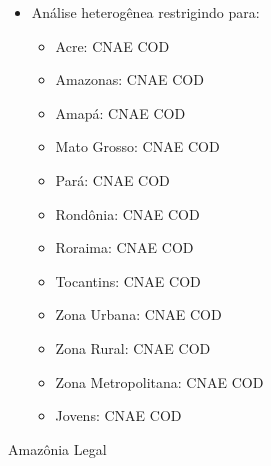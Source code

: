 \documentclass[8pt]{beamer}
\begin{document}
\begin{frame}[label=indice_principal]{}
\begin{itemize}
\item{Análise heterogênea restrigindo para:
	\begin{itemize}
	\item{Acre: CNAE	\hyperlink{amzaccod2dig}{} COD 	\hyperlink{amzaccod2dig}{}}
	\item{Amazonas: CNAE	\hyperlink{amzamcod2dig}{} COD 	\hyperlink{amzamcod2dig}{}}
	\item{Amapá: CNAE	\hyperlink{amzapcod2dig}{} COD 	\hyperlink{amzapcod2dig}{}}
	\item{Mato Grosso: CNAE	\hyperlink{amzmtcod2dig}{} COD 	\hyperlink{amzmtcod2dig}{}}
	\item{Pará: CNAE	\hyperlink{amzpacod2dig}{} COD 	\hyperlink{amzpacod2dig}{}}
	\item{Rondônia: CNAE	\hyperlink{amzrocod2dig}{} COD 	\hyperlink{amzrocod2dig}{}}
	\item{Roraima: CNAE	\hyperlink{amzrrcod2dig}{} COD 	\hyperlink{amzrrcod2dig}{}}
	\item{Tocantins: CNAE	\hyperlink{amztocod2dig}{} COD 	\hyperlink{amztocod2dig}{}}
	\item{Zona Urbana: CNAE	\hyperlink{amzurbanacod2dig}{} COD 	\hyperlink{amzurbanacod2dig}{}}
	\item{Zona Rural: CNAE	\hyperlink{amzruralcod2dig}{} COD 	\hyperlink{amzruralcod2dig}{}}
	\item{Zona Metropolitana: CNAE	\hyperlink{amzmetropolitanacod2dig}{} COD 	\hyperlink{amzmetropolitanacod2dig}{}}
	\item{Jovens: CNAE	\hyperlink{amzjovemcod2dig}{} COD 	\hyperlink{amzjovemcod2dig}{}}
	\vspace{1mm}
	\end{itemize}
}

\end{itemize}

\end{frame}


\begin{frame}[label=amzcod2dig]{Amazônia Legal}
\textit{\hyperlink{indice_principal}{}}

\end{frame}
\end{document}

